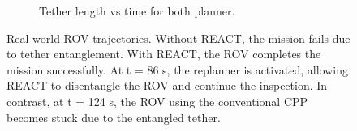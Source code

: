 \begin{figure}[t]
\begin{subfigure}[b]{0.48\linewidth}
        \caption{Tether length vs time for both planner.}
        \label{fig:traj_react}
    \end{subfigure}
    \caption{Real-world ROV trajectories. Without \ac{REACT}, the mission fails due to tether entanglement. With \ac{REACT}, the ROV completes the mission successfully. At t = 86 s, the replanner is activated, allowing \ac{REACT} to disentangle the \ac{ROV} and continue the inspection. In contrast, at t = 124 s, the \ac{ROV} using the conventional \ac{CPP} becomes stuck due to the entangled tether.}
    \label{fig:realworld_trajectory}
\end{figure}